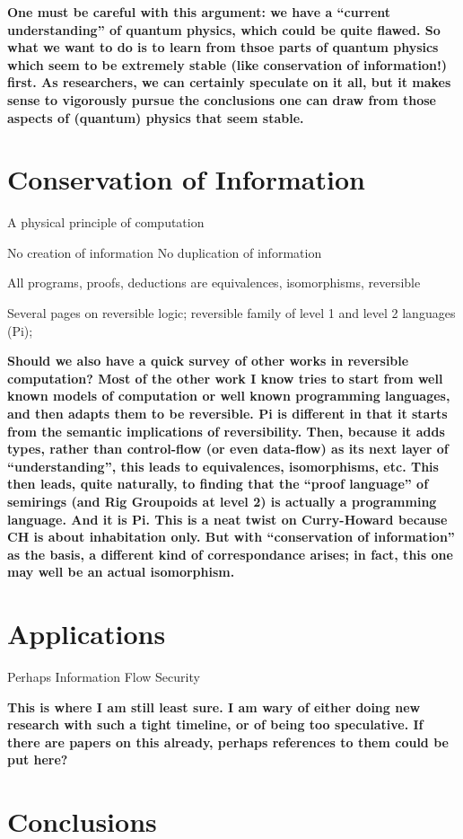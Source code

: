 \documentclass[12pt]{article}
\newcommand{\jc}[1]{\fbox{Jacques says:} \textbf{#1}}
\begin{document}
\jc{One must be careful with this argument: we have a ``current
understanding'' of quantum physics, which could be quite flawed.
So what we want to do is to learn from thsoe parts of quantum physics
which seem to be extremely stable (like conservation of information!)
first. As researchers, we can certainly speculate on it all, but it
makes sense to vigorously pursue the conclusions one can draw from
those aspects of (quantum) physics that seem stable.}

\section{Conservation of Information}

A physical principle of computation

No creation of information
No duplication of information

All programs, proofs, deductions are equivalences, isomorphisms,
reversible

Several pages on reversible logic; reversible family of level 1 and
level 2 languages (Pi);

\jc{Should we also have a quick survey of other works in reversible
computation? Most of the other work I know tries to start from
well known models of computation or well known programming languages,
and then adapts them to be reversible. Pi is different in that it
starts from the semantic implications of reversibility. Then, because
it adds types, rather than control-flow (or even data-flow) as its
next layer of ``understanding'', this leads to equivalences, isomorphisms,
etc.  This then leads, quite naturally, to finding that the ``proof
language'' of semirings (and Rig Groupoids at level 2) is actually a
programming language. And it is Pi. This is a neat twist on Curry-Howard
because CH is about \textbf{inhabitation} only. But with ``conservation
of information'' as the basis, a different kind of correspondance
arises; in fact, this one may well be an actual isomorphism.}

\section{Applications}

Perhaps Information Flow Security

\jc{This is where I am still least sure. I am wary of either doing
new research with such a tight timeline, or of being too speculative.
If there are papers on this already, perhaps references to them could
be put here?}

\section{Conclusions}

\end{document}
